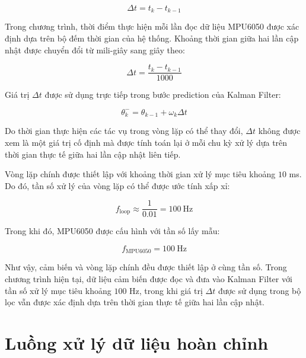 \documentclass[a4paper,12pt]{report}
\begin{document}
\begin{equation}
\Delta t
=
t_k-t_{k-1}
\end{equation}

Trong chương trình, thời điểm thực hiện mỗi lần đọc dữ liệu MPU6050 được xác định dựa trên bộ đếm thời gian của hệ thống. Khoảng thời gian giữa hai lần cập nhật được chuyển đổi từ mili-giây sang giây theo:

\begin{equation}
\Delta t
=
\frac{t_k-t_{k-1}}{1000}
\end{equation}

Giá trị $\Delta t$ được sử dụng trực tiếp trong bước prediction của Kalman Filter:

\begin{equation}
\theta_k^-
=
\theta_{k-1}
+
\omega_k\Delta t
\end{equation}

Do thời gian thực hiện các tác vụ trong vòng lặp có thể thay đổi, $\Delta t$ không được xem là một giá trị cố định mà được tính toán lại ở mỗi chu kỳ xử lý dựa trên thời gian thực tế giữa hai lần cập nhật liên tiếp.

Vòng lặp chính được thiết lập với khoảng thời gian xử lý mục tiêu khoảng $10$ ms. Do đó, tần số xử lý của vòng lặp có thể được ước tính xấp xỉ:

\begin{equation}
f_{\text{loop}}
\approx
\frac{1}{0.01}
=
100\ \text{Hz}
\end{equation}

Trong khi đó, MPU6050 được cấu hình với tần số lấy mẫu:

\begin{equation}
f_{\text{MPU6050}}=100\ \text{Hz}
\end{equation}

Như vậy, cảm biến và vòng lặp chính đều được thiết lập ở cùng tần số. Trong chương trình hiện tại, dữ liệu cảm biến được đọc và đưa vào Kalman Filter với tần số xử lý mục tiêu khoảng $100$ Hz, trong khi giá trị $\Delta t$ được sử dụng trong bộ lọc vẫn được xác định dựa trên thời gian thực tế giữa hai lần cập nhật.


\section{Luồng xử lý dữ liệu hoàn chỉnh}
\label{sec:complete-flow}
\end{document}
